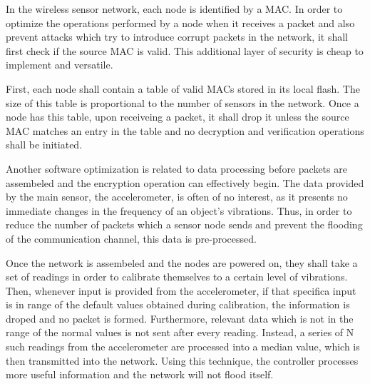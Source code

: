 In the wireless sensor network, each node is identified by a MAC. In order to optimize the 
operations performed by a node when it receives a packet and also prevent attacks which 
try to introduce corrupt packets in the network, it shall first check if the source MAC 
is valid. This additional layer of security is cheap to implement and versatile.

First, each node shall contain a table of valid MACs stored in its local flash. The size of this 
table is proportional to the number of sensors in the network. Once a node has this table, upon 
receiveing a packet, it shall drop it unless the source MAC matches an entry in the table 
and no decryption and verification operations shall be initiated.

Another software optimization is related to data processing before packets are assembeled and 
the encryption operation can effectively begin. The data provided by the main sensor, the 
accelerometer, is often of no interest, as it presents no immediate changes in the frequency of 
an object's vibrations. Thus, in order to reduce the number of packets which a sensor node sends 
and prevent the flooding of the communication channel, this data is pre-processed.

Once the network is assembeled and the nodes are powered on, they shall take a set of 
readings in order to calibrate themselves to a certain level of vibrations. Then, 
whenever input is provided from the accelerometer, if that specifica input is in 
range of the default values obtained during calibration, the information is droped 
and no packet is formed. Furthermore, relevant data which is not in the range of the 
normal values is not sent after every reading. Instead, a series of N such readings 
from the accelerometer are processed into a median value, which is then transmitted 
into the network. Using this technique, the controller processes more useful information 
and the network will not flood itself.
